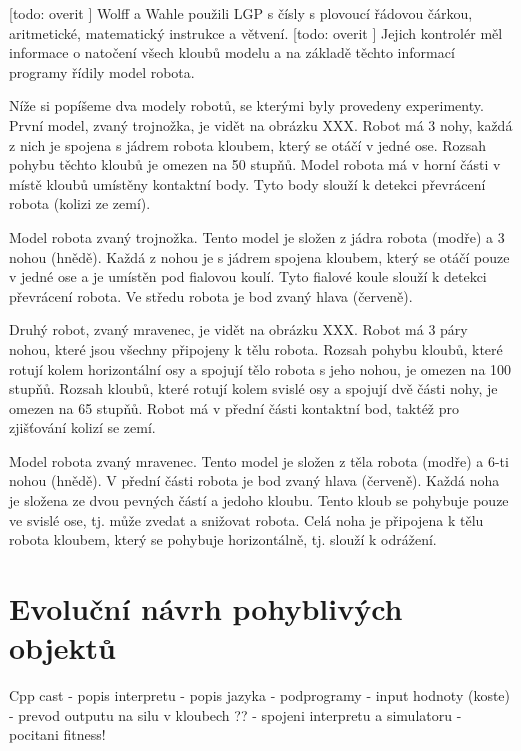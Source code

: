 [todo: overit ] Wolff a Wahle použili LGP s čísly s plovoucí řádovou čárkou, aritmetické, matematický instrukce a větvení.
[todo: overit ] Jejich kontrolér měl informace o natočení všech kloubů modelu a na základě těchto informací programy řídily model robota.




Níže si popíšeme dva modely robotů, se kterými byly provedeny experimenty.
První model, zvaný trojnožka, je vidět na obrázku XXX.
Robot má 3 nohy, každá z nich je spojena s jádrem robota kloubem, který se otáčí v jedné ose.
Rozsah pohybu těchto kloubů je omezen na 50 stupňů.
Model robota má v horní části v místě kloubů umístěny kontaktní body.
Tyto body slouží k detekci převrácení robota (kolizi ze zemí).

Model robota zvaný trojnožka.
Tento model je složen z jádra robota (modře) a 3 nohou (hnědě).
Každá z nohou je s jádrem spojena kloubem, který se otáčí pouze v jedné ose a je umístěn pod fialovou koulí.
Tyto fialové koule slouží k detekci převrácení robota.
Ve středu robota je bod zvaný hlava (červeně).

Druhý robot, zvaný mravenec, je vidět na obrázku XXX.
Robot má 3 páry nohou, které jsou všechny připojeny k tělu robota.
Rozsah pohybu kloubů, které rotují kolem horizontální osy a spojují tělo robota s jeho nohou, je omezen na 100 stupňů.
Rozsah kloubů, které rotují kolem svislé osy a spojují dvě části nohy, je omezen na 65 stupňů.
Robot má v přední části kontaktní bod, taktéž pro zjišťování kolizí se zemí.

Model robota zvaný mravenec.
Tento model je složen z těla robota (modře) a 6-ti nohou (hnědě).
V přední části robota je bod zvaný hlava (červeně).
Každá noha je složena ze dvou pevných částí a jedoho kloubu.
Tento kloub se pohybuje pouze ve svislé ose, tj. může zvedat a snižovat robota.
Celá noha je připojena k tělu robota kloubem, který se pohybuje horizontálně, tj. slouží k odrážení.

\chapter{Evoluční návrh pohyblivých objektů}


Cpp cast
- popis interpretu
- popis jazyka
- podprogramy
- input hodnoty (koste)
- prevod outputu na silu v kloubech ??
- spojeni interpretu a simulatoru
- pocitani fitness!

